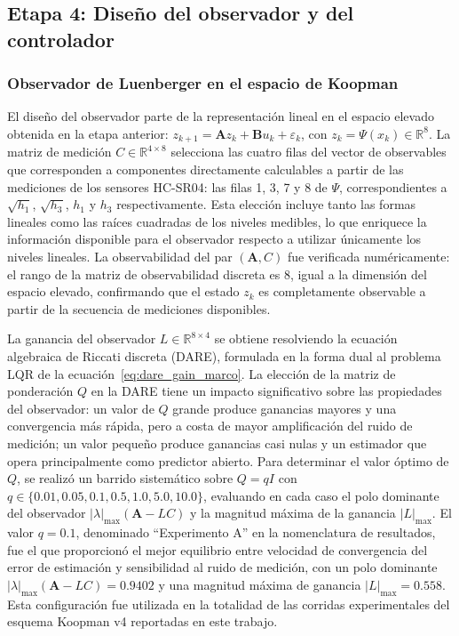 \documentclass[12pt,letterpaper]{article}
\begin{document}
\subsection{Etapa 4: Diseño del observador y del controlador}
\label{sec:diseno}

\subsubsection{Observador de Luenberger en el espacio de Koopman}

El diseño del observador parte de la representación lineal en el espacio 
elevado obtenida en la etapa anterior: $z_{k+1} = \mathbf{A} z_k + 
\mathbf{B} u_k + \varepsilon_k$, con $z_k = \Psi(x_k) \in \mathbb{R}^8$. 
La matriz de medición $C \in \mathbb{R}^{4 \times 8}$ selecciona las 
cuatro filas del vector de observables que corresponden a componentes 
directamente calculables a partir de las mediciones de los sensores 
HC-SR04: las filas 1, 3, 7 y 8 de $\Psi$, correspondientes a $\sqrt{h_1}$, 
$\sqrt{h_3}$, $h_1$ y $h_3$ respectivamente. Esta elección incluye tanto 
las formas lineales como las raíces cuadradas de los niveles medibles, lo 
que enriquece la información disponible para el observador respecto a 
utilizar únicamente los niveles lineales. La observabilidad del par 
$(\mathbf{A}, C)$ fue verificada numéricamente: el rango de la matriz de 
observabilidad discreta es $8$, igual a la dimensión del espacio elevado, 
confirmando que el estado $z_k$ es completamente observable a partir de 
la secuencia de mediciones disponibles.

La ganancia del observador $L \in \mathbb{R}^{8 \times 4}$ se obtiene 
resolviendo la ecuación algebraica de Riccati discreta (DARE), formulada 
en la forma dual al problema LQR de la ecuación~\eqref{eq:dare_gain_marco}. 
La elección de la matriz de ponderación $Q$ en la DARE tiene un impacto 
significativo sobre las propiedades del observador: un valor de $Q$ grande 
produce ganancias mayores y una convergencia más rápida, pero a costa de 
mayor amplificación del ruido de medición; un valor pequeño produce 
ganancias casi nulas y un estimador que opera principalmente como predictor 
abierto. Para determinar el valor óptimo de $Q$, se realizó un barrido 
sistemático sobre $Q = q I$ con $q \in \{0.01, 0.05, 0.1, 0.5, 1.0, 
5.0, 10.0\}$, evaluando en cada caso el polo dominante del observador 
$|\lambda|_{\max}(\mathbf{A} - LC)$ y la magnitud máxima de la ganancia 
$|L|_{\max}$. El valor $q = 0.1$, denominado ``Experimento A'' en la
nomenclatura de resultados, fue el que proporcionó el mejor equilibrio
entre velocidad de convergencia del error de estimación y sensibilidad al 
ruido de medición, con un polo dominante $|\lambda|_{\max}(\mathbf{A} -
LC) = 0.9402$ y una magnitud máxima de ganancia $|L|_{\max} = 0.558$.
Esta configuración fue utilizada en la totalidad de las corridas
experimentales del esquema Koopman v4 reportadas en este trabajo.
\end{document}
